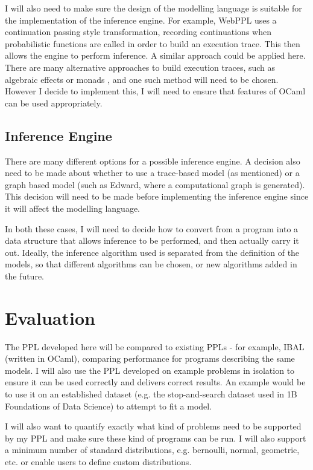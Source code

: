 I will also need to make sure the design of the modelling language is suitable for the implementation of the inference engine. For example, WebPPL \cite{mobus2018structure} uses a continuation passing style transformation, recording continuations when probabilistic functions are called in order to build an execution trace. This then allows the engine to perform inference. A similar approach could be applied here. There are many alternative approaches to build execution traces, such as algebraic effects \cite{DBLP:journals/corr/abs-1811-06150} or monads \cite{scibior2015practical}, and one such method will need to be chosen. However I decide to implement this, I will need to ensure that features of OCaml can be used appropriately.

\subsection*{Inference Engine}
There are many different options for a possible inference engine. A decision also need to be made about whether to use a trace-based model (as mentioned) or a graph based model (such as Edward, where a computational graph is generated). This decision will need to be made before implementing the inference engine since it will affect the modelling language.

In both these cases, I will need to decide how to convert from a program into a data structure that allows inference to be performed, and then actually carry it out. Ideally, the inference algorithm used is separated from the definition of the models, so that different algorithms can be chosen, or new algorithms added in the future.

\section*{Evaluation}

The PPL developed here will be compared to existing PPLs - for example, IBAL (written in OCaml), comparing performance for programs describing the same models. I will also use the PPL developed on example problems in isolation to ensure it can be used correctly and delivers correct results. An example would be to use it on an established dataset (e.g. the stop-and-search dataset used in 1B Foundations of Data Science) to attempt to fit a model.

I will also want to quantify exactly what kind of problems need to be supported by my PPL and make sure these kind of programs can be run. I will also support a minimum number of standard distributions, e.g. bernoulli, normal, geometric, etc. or enable users to define custom distributions.

